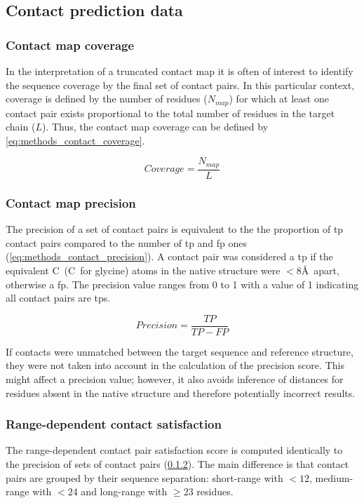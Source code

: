 \subsection{Contact prediction data}
\subsubsection{Contact map coverage}
In the interpretation of a truncated contact map it is often of interest to identify the sequence coverage by the final set of contact pairs. In this particular context, coverage is defined by the number of residues ($N_{map}$) for which at least one contact pair exists proportional to the total number of residues in the target chain ($L$). Thus, the contact map coverage can be defined by \cref{eq:methods_contact_coverage}.

\begin{equation}
    Coverage=\frac{N_{map}}{L}
    \label{eq:methods_contact_coverage}
\end{equation}

\subsubsection{Contact map precision} \label{sec:methods_contact_map_prec} 
The precision of a set of contact pairs is equivalent to the the proportion of \gls{tp} contact pairs compared to the number of \gls{tp} and \gls{fp} ones (\cref{eq:methods_contact_precision}). A contact pair was considered a \gls{tp} if the equivalent C\textbeta\ (C\textalpha\ for glycine) atoms in the native structure were $<8$\AA\ apart, otherwise a \gls{fp}. The precision value ranges from 0 to 1 with a value of 1 indicating all contact pairs are \gls{tp}s. 

\begin{equation} 
    Precision=\frac{TP}{TP-FP}
    \label{eq:methods_contact_precision}
\end{equation}

If contacts were unmatched between the target sequence and reference structure, they were not taken into account in the calculation of the precision score. This might affect a precision value; however, it also avoids inference of distances for residues absent in the native structure and therefore potentially incorrect results.

\subsubsection{Range-dependent contact satisfaction} \label{sec:methods_longrange_satisfaction}
The range-dependent contact pair satisfaction score is computed identically to the precision of sets of contact pairs (\cref{sec:methods_contact_map_prec}). The main difference is that contact pairs are grouped by their sequence separation: short-range with $<12$, medium-range with $<24$ and long-range with $\geq23$ residues.

